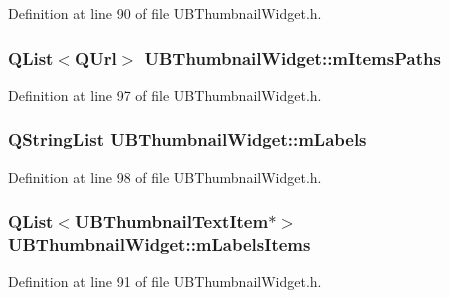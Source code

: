 Definition at line 90 of file U\-B\-Thumbnail\-Widget.\-h.

\hypertarget{class_u_b_thumbnail_widget_a3b9f8d357b3c3ea67cb99bc2b8d2083c}{
\subsubsection[{m\-Items\-Paths}]{\setlength{\rightskip}{0pt plus 5cm}Q\-List$<$Q\-Url$>$ U\-B\-Thumbnail\-Widget\-::m\-Items\-Paths\hspace{0.3cm}{\ttfamily [protected]}}}\label{d2/d7e/class_u_b_thumbnail_widget_a3b9f8d357b3c3ea67cb99bc2b8d2083c}


Definition at line 97 of file U\-B\-Thumbnail\-Widget.\-h.

\hypertarget{class_u_b_thumbnail_widget_a843453749e9b655e9714e5048810260a}{
\subsubsection[{m\-Labels}]{\setlength{\rightskip}{0pt plus 5cm}Q\-String\-List U\-B\-Thumbnail\-Widget\-::m\-Labels\hspace{0.3cm}{\ttfamily [protected]}}}\label{d2/d7e/class_u_b_thumbnail_widget_a843453749e9b655e9714e5048810260a}


Definition at line 98 of file U\-B\-Thumbnail\-Widget.\-h.

\hypertarget{class_u_b_thumbnail_widget_a866fb03682f82cdc495edd71c56ccfdb}{
\subsubsection[{m\-Labels\-Items}]{\setlength{\rightskip}{0pt plus 5cm}Q\-List$<${\bf U\-B\-Thumbnail\-Text\-Item}$\ast$$>$ U\-B\-Thumbnail\-Widget\-::m\-Labels\-Items\hspace{0.3cm}{\ttfamily [protected]}}}\label{d2/d7e/class_u_b_thumbnail_widget_a866fb03682f82cdc495edd71c56ccfdb}


Definition at line 91 of file U\-B\-Thumbnail\-Widget.\-h.

